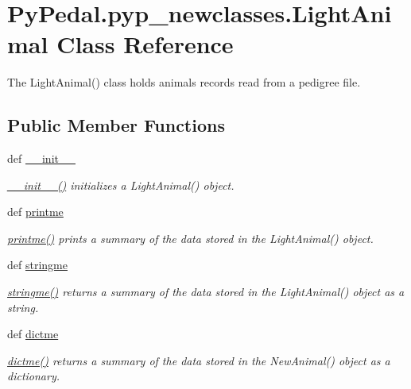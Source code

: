 \hypertarget{classPyPedal_1_1pyp__newclasses_1_1LightAnimal}{
\section{PyPedal.pyp\_\-newclasses.LightAnimal Class Reference}
\label{classPyPedal_1_1pyp__newclasses_1_1LightAnimal}
}


The LightAnimal() class holds animals records read from a pedigree file.  


\subsection*{Public Member Functions}
\begin{DoxyCompactItemize}
\item 
def \hyperlink{classPyPedal_1_1pyp__newclasses_1_1LightAnimal_aa410001c85ab942a73f9d4be4148ccc2}{\_\-\_\-init\_\-\_\-}
\begin{DoxyCompactList}\small\item\em \hyperlink{classPyPedal_1_1pyp__newclasses_1_1LightAnimal_aa410001c85ab942a73f9d4be4148ccc2}{\_\-\_\-init\_\-\_\-()} initializes a LightAnimal() object. \end{DoxyCompactList}\item 
def \hyperlink{classPyPedal_1_1pyp__newclasses_1_1LightAnimal_aced172e326bbcc039d74541f3736b7af}{printme}
\begin{DoxyCompactList}\small\item\em \hyperlink{classPyPedal_1_1pyp__newclasses_1_1LightAnimal_aced172e326bbcc039d74541f3736b7af}{printme()} prints a summary of the data stored in the LightAnimal() object. \end{DoxyCompactList}\item 
def \hyperlink{classPyPedal_1_1pyp__newclasses_1_1LightAnimal_a609e38ea9b8033460b7adf96dad95e17}{stringme}
\begin{DoxyCompactList}\small\item\em \hyperlink{classPyPedal_1_1pyp__newclasses_1_1LightAnimal_a609e38ea9b8033460b7adf96dad95e17}{stringme()} returns a summary of the data stored in the LightAnimal() object as a string. \end{DoxyCompactList}\item 
def \hyperlink{classPyPedal_1_1pyp__newclasses_1_1LightAnimal_a8016e0f0ce7359a441f944668ec312be}{dictme}
\begin{DoxyCompactList}\small\item\em \hyperlink{classPyPedal_1_1pyp__newclasses_1_1LightAnimal_a8016e0f0ce7359a441f944668ec312be}{dictme()} returns a summary of the data stored in the NewAnimal() object as a dictionary. \end{DoxyCompactList}\item 

\end{DoxyCompactItemize}

